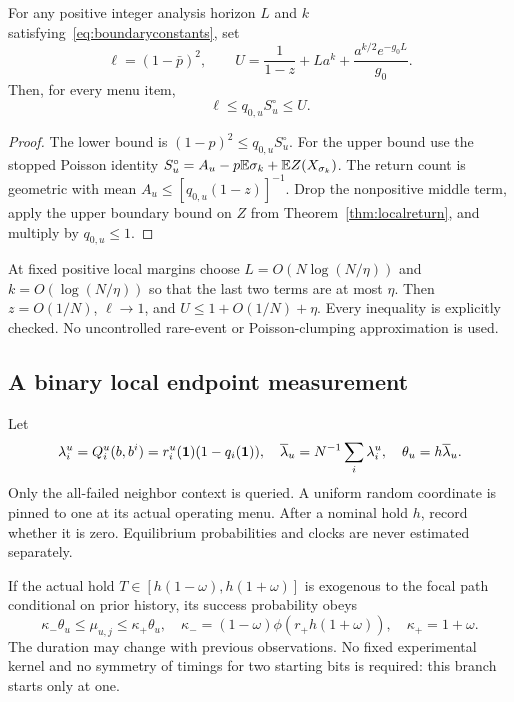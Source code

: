 \begin{theorem}\label{thm:boundary}
For any positive integer analysis horizon $L$ and $k$ satisfying~\eqref{eq:boundaryconstants}, set
\begin{equation}
 \ell=(1-\bar p)^2,\qquad
 U=\frac1{1-z}+La^k+\frac{a^{k/2}e^{-g_0L}}{g_0}.
 \label{eq:boundaryenvelope}
\end{equation}
Then, for every menu item,
\begin{equation}
 \boxed{\ell\le q_{0,u}S_u^\circ\le U.}
 \label{eq:boundarybridge}
\end{equation}
\end{theorem}
\begin{proof}
The lower bound is $(1-p)^2\le q_{0,u}S_u^\circ$. For the upper bound use the stopped Poisson identity $S_u^\circ=A_u-p\mathbb E\sigma_k+\mathbb E Z(X_{\sigma_k})$. The return count is geometric with mean $A_u\le[q_{0,u}(1-z)]^{-1}$. Drop the nonpositive middle term, apply the upper boundary bound on $Z$ from Theorem~\ref{thm:localreturn}, and multiply by $q_{0,u}\le1$.
\end{proof}
At fixed positive local margins choose $L=O(N\log(N/\eta))$ and $k=O(\log(N/\eta))$ so that the last two terms are at most $\eta$. Then $z=O(1/N)$, $\ell\to1$, and $U\le1+O(1/N)+\eta$. Every inequality is explicitly checked. No uncontrolled rare-event or Poisson-clumping approximation is used.

\subsection{A binary local endpoint measurement}
Let
\[
 \lambda_i^u=Q_i^u(b,b^i)=r_i^u(\mathbf 1)(1-q_i(\mathbf 1)),\quad
 \overline\lambda_u=N^{-1}\sum_i\lambda_i^u,\quad\theta_u=h\overline\lambda_u.
\]
Only the all-failed neighbor context is queried. A uniform random coordinate is pinned to one at its actual operating menu. After a nominal hold $h$, record whether it is zero. Equilibrium probabilities and clocks are never estimated separately.

If the actual hold $T\in[h(1-\omega),h(1+\omega)]$ is exogenous to the focal path conditional on prior history, its success probability obeys
\begin{equation}
 \kappa_-\theta_u\le\mu_{u,j}\le\kappa_+\theta_u,
 \quad\kappa_-=(1-\omega)\phi(r_+h(1+\omega)),\quad\kappa_+=1+\omega.
 \label{eq:directresponse}
\end{equation}
The duration may change with previous observations. No fixed experimental kernel and no symmetry of timings for two starting bits is required: this branch starts only at one.

